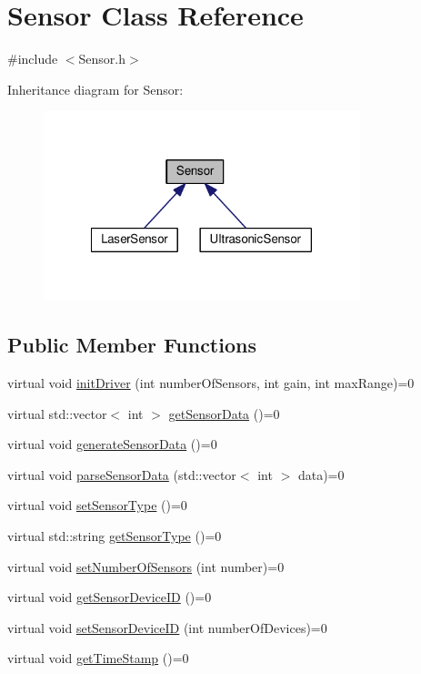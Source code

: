 \hypertarget{classSensor}{\section{Sensor Class Reference}
\label{classSensor}
}


{\ttfamily \#include $<$Sensor.\-h$>$}



Inheritance diagram for Sensor\-:
\nopagebreak
\begin{figure}[H]
\begin{center}
\leavevmode
\includegraphics[width=261pt]{classSensor__inherit__graph}
\end{center}
\end{figure}
\subsection*{Public Member Functions}
\begin{DoxyCompactItemize}
\item 
virtual void \hyperlink{classSensor_a12851eb9413ee61c2d694b4168e365fd}{init\-Driver} (int number\-Of\-Sensors, int gain, int max\-Range)=0
\item 
virtual std\-::vector$<$ int $>$ \hyperlink{classSensor_a795dda4f99ae87b9d66c3c5a07722d1b}{get\-Sensor\-Data} ()=0
\item 
virtual void \hyperlink{classSensor_a1cabdc10d3319abeaa8db56724fa36e5}{generate\-Sensor\-Data} ()=0
\item 
virtual void \hyperlink{classSensor_a32f0d1754f66bdb26bbece93e05b9a44}{parse\-Sensor\-Data} (std\-::vector$<$ int $>$ data)=0
\item 
virtual void \hyperlink{classSensor_a53daf1760d09355a8d3846addc53bd6e}{set\-Sensor\-Type} ()=0
\item 
virtual std\-::string \hyperlink{classSensor_a6cf36c37e69761711982fed5d14aeb4e}{get\-Sensor\-Type} ()=0
\item 
virtual void \hyperlink{classSensor_a5372c229e1bf77d70d48506af8abd351}{set\-Number\-Of\-Sensors} (int number)=0
\item 
virtual void \hyperlink{classSensor_af7ff987e1f0f6b7c4acf2910212fde95}{get\-Sensor\-Device\-I\-D} ()=0
\item 
virtual void \hyperlink{classSensor_a3a7ad3cdc0e9a5ef6f5ce684c7a0c59a}{set\-Sensor\-Device\-I\-D} (int number\-Of\-Devices)=0
\item 
virtual void \hyperlink{classSensor_a8c6ceb519eb8720a0e9cedd84624a7ff}{get\-Time\-Stamp} ()=0
\end{DoxyCompactItemize}


